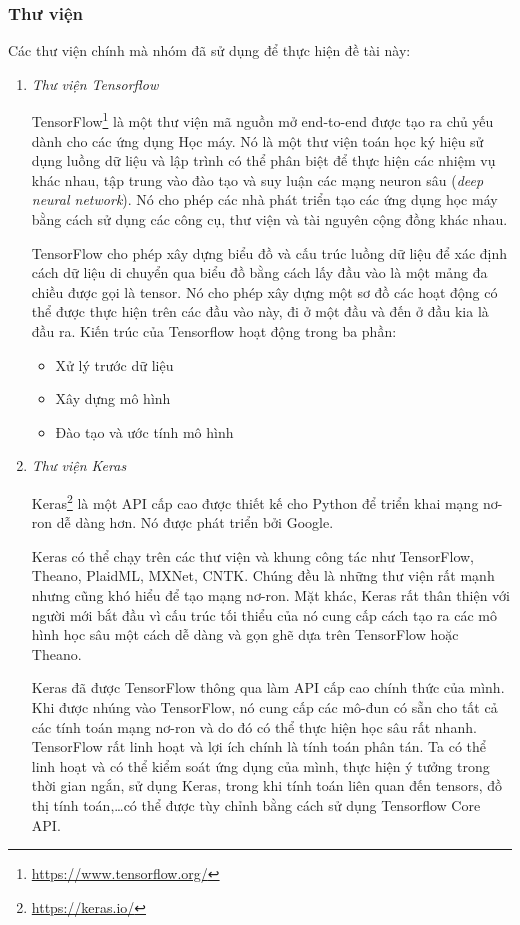 \subsubsection{Thư viện}
Các thư viện chính mà nhóm đã sử dụng để thực hiện đề tài này:
\begin{enumerate}
    \item \textit{Thư viện Tensorflow}

          TensorFlow\footnote{\url{https://www.tensorflow.org/}} là một thư viện mã nguồn mở end-to-end được tạo ra chủ yếu dành cho các ứng dụng Học máy. Nó là một thư viện toán học ký hiệu sử dụng luồng dữ liệu và lập trình có thể phân biệt để thực hiện các nhiệm vụ khác nhau, tập trung vào đào tạo và suy luận các mạng neuron sâu (\textit{deep neural network}). Nó cho phép các nhà phát triển tạo các ứng dụng học máy bằng cách sử dụng các công cụ, thư viện và tài nguyên cộng đồng khác nhau\cite{webpage16}.

          TensorFlow cho phép xây dựng biểu đồ và cấu trúc luồng dữ liệu để xác định cách dữ liệu di chuyển qua biểu đồ bằng cách lấy đầu vào là một mảng đa chiều được gọi là tensor. Nó cho phép xây dựng một sơ đồ các hoạt động có thể được thực hiện trên các đầu vào này, đi ở một đầu và đến ở đầu kia là đầu ra.
          Kiến trúc của Tensorflow hoạt động trong ba phần:
          \begin{itemize}
              \item Xử lý trước dữ liệu
              \item Xây dựng mô hình
              \item Đào tạo và ước tính mô hình
          \end{itemize}

    \item \textit{Thư viện Keras}

          Keras\footnote{\url{https://keras.io/}} là một API cấp cao được thiết kế cho Python để triển khai mạng nơ-ron dễ dàng hơn. Nó được phát triển bởi Google.

          Keras có thể chạy trên các thư viện và khung công tác như TensorFlow, Theano, PlaidML, MXNet, CNTK. Chúng đều là những thư viện rất mạnh nhưng cũng khó hiểu để tạo mạng nơ-ron. Mặt khác, Keras rất thân thiện với người mới bắt đầu vì cấu trúc tối thiểu của nó cung cấp cách tạo ra các mô hình học sâu một cách dễ dàng và gọn ghẽ dựa trên TensorFlow hoặc Theano.

          Keras đã được TensorFlow thông qua làm API cấp cao chính thức của mình. Khi được nhúng vào TensorFlow, nó cung cấp các mô-đun có sẵn cho tất cả các tính toán mạng nơ-ron và do đó có thể thực hiện học sâu rất nhanh. TensorFlow rất linh hoạt và lợi ích chính là tính toán phân tán. Ta có thể linh hoạt và có thể kiểm soát ứng dụng của mình, thực hiện ý tưởng trong thời gian ngắn, sử dụng Keras, trong khi tính toán liên quan đến tensors, đồ thị tính toán,\dots có thể được tùy chỉnh bằng cách sử dụng Tensorflow Core API.


\end{enumerate}
